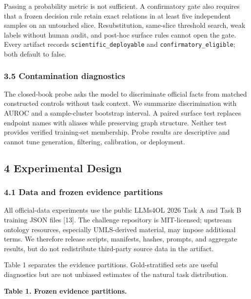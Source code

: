 \documentclass[
]{article}
\begin{document}
Passing a probability metric is not sufficient. A confirmatory gate also
requires that a frozen decision rule retain exact relations in at least
five independent samples on an untouched slice. Resubstitution,
same-slice threshold search, weak labels without human audit, and
post-hoc surface rules cannot open the gate. Every artifact records
\texttt{scientific\_deployable} and \texttt{confirmatory\_eligible};
both default to false.

\subsubsection{3.5 Contamination
diagnostics}\label{contamination-diagnostics}

The closed-book probe asks the model to discriminate official facts from
matched constructed controls without task context. We summarize
discrimination with AUROC and a sample-cluster bootstrap interval. A
paired surface test replaces endpoint names with aliases while
preserving graph structure. Neither test provides verified training-set
membership. Probe results are descriptive and cannot tune generation,
filtering, calibration, or deployment.

\subsection{4 Experimental Design}\label{experimental-design}

\subsubsection{4.1 Data and frozen evidence
partitions}\label{data-and-frozen-evidence-partitions}

All official-data experiments use the public LLMs4OL 2026 Task A and
Task B training JSON files {[}13{]}. The challenge repository is
MIT-licensed; upstream ontology resources, especially UMLS-derived
material, may impose additional terms. We therefore release scripts,
manifests, hashes, prompts, and aggregate results, but do not
redistribute third-party source data in the artifact.

Table 1 separates the evidence partitions. Gold-stratified sets are
useful diagnostics but are not unbiased estimates of the natural task
distribution.

\textbf{Table 1. Frozen evidence partitions.}
\end{document}
